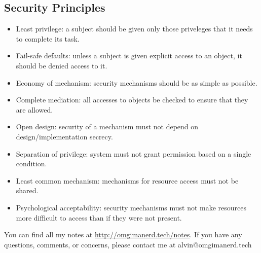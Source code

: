 \documentclass{math}
\begin{document}
\subsection*{Security Principles}
\begin{itemize}
  \item Least privilege: a subject should be given only those priveleges that it
  needs to complete its task.
  \item Fail-safe defaults: unless a subject is given explicit access to an
  object, it should be denied access to it.
  \item Economy of mechanism: security mechanisms should be as simple as
  possible.
  \item Complete mediation: all accesses to objects be checked to ensure that
  they are allowed.
  \item Open design: security of a mechanism must not depend on
  design/implementation secrecy.
  \item Separation of privilege: system must not grant permission based on a
  single condition.
  \item Least common mechanism: mechanisms for resource access must not be
  shared.
  \item Psychological acceptability: security mechanisms must not make resources
  more difficult to access than if they were not present.
\end{itemize}

\begin{center}
  You can find all my notes at \url{http://omgimanerd.tech/notes}. If you have
  any questions, comments, or concerns, please contact me at
  alvin@omgimanerd.tech
\end{center}
\end{document}
